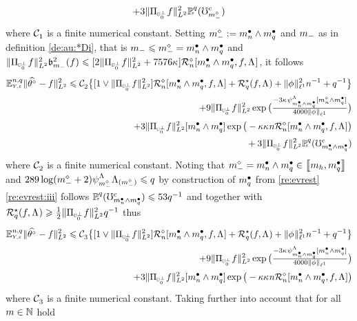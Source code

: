 \begin{pro}
\begin{multline*}
+3
\VnormLp{\Proj[{\mHiH[0]^\perp}]\xdf}^2\FuVg[\ssE]{\rE}(\aixEv[\mdDi]^c)
  \end{multline*}
where $\cst{1}$ is a finite numerical constant. Setting
$\mdDi:=\sDi{\ssY}\wedge\sDi{\ssE}$  and $\mDi$ as in  definition
\eqref{de:au:*Di}, that is  $\mDi\leq\mdDi=\sDi{\ssY}\wedge\sDi{\ssE}$ and  $\VnormLp{\Proj[{\mHiH[0]^\perp}]\xdf}^2\bias[\mDi]^2(\xdf) \leq
  [2\VnormLp{\Proj[{\mHiH[0]^\perp}]\xdf}^2+7576\cpen]\hRaDi{\sDi{\ssY}\wedge\sDi{\ssE},\xdf,\iSv}$,
  it follows
\begin{multline*}
\FuEx[\ssY,\ssE]{\rY,\rE}\VnormLp{\hxdfPr[]-\xdf}^2\leq\cst{2}\big\{[1\vee\VnormLp{\Proj[{\mHiH[0]^\perp}]\xdf}^2]\hRaDi{\sDi{\ssY}\wedge\sDi{\ssE},\xdf,\iSv}+\mRa{\xdf,\iSv}+\Vnormlp[1]{\fydf}^2\ssY^{-1}+\ssE^{-1}\big\}
\\
\hfill+9
\VnormLp{\Proj[{\mHiH[0]^\perp}]\xdf}^2\exp\big(\tfrac{-3\cpen\cmiSv[\sDi{\ssY}\wedge\sDi{\ssE}][\aDi{\ssY}\wedge\sDi{\ssE}]}{4000\Vnormlp[1]{\fydf}}\big)
\\\hfill
+3
\VnormLp{\Proj[{\mHiH[0]^\perp}]\xdf}^2[\sDi{\ssY}\wedge\sDi{\ssE}]\exp\big(-\rWc\cpen\ssY\hRaDi{\sDi{\ssY}\wedge\sDi{\ssE},\xdf,\iSv}\big)\\\null\hfill
+3
\VnormLp{\Proj[{\mHiH[0]^\perp}]\xdf}^2\FuVg[\ssE]{\rE}(\aixEv[\sDi{\ssY}\wedge\sDi{\ssE}]^c)
  \end{multline*}
where $\cst{2}$ is a finite numerical constant. Noting that
$\mdDi=\sDi{\ssY}\wedge\sDi{\ssE}\in\nset{\Di_{\ydf},\sDi{\ssE}}$ and
$289\log(\mdDi+2)\cmiSv[\mdDi]\miSv[\mdDi]\leq\ssE$ by construction of
$\sDi{\ssE}$ from \cref{re:evrest} \ref{re:evrest:iii} follows
$\FuVg[\ssE]{\rE}(\aixEv[\sDi{\ssY}\wedge\sDi{\ssE}]^c)\leq53\ssE^{-1}$
and  together with $\mRa{\xdf,\iSv}\geq\tfrac{1}{2}\VnormLp{\Proj[{\mHiH[0]^\perp}]\xdf}^2\ssE^{-1}$
thus
\begin{multline*}
\FuEx[\ssY,\ssE]{\rY,\rE}\VnormLp{\hxdfPr[]-\xdf}^2\leq\cst{3}\big\{[1\vee\VnormLp{\Proj[{\mHiH[0]^\perp}]\xdf}^2]\hRaDi{\sDi{\ssY}\wedge\sDi{\ssE},\xdf,\iSv}+\mRa{\xdf,\iSv}+\Vnormlp[1]{\fydf}^2\ssY^{-1}+\ssE^{-1}\big\}
\\
\hfill+9
\VnormLp{\Proj[{\mHiH[0]^\perp}]\xdf}^2\exp\big(\tfrac{-3\cpen\cmiSv[\sDi{\ssY}\wedge\sDi{\ssE}][\sDi{\ssY}\wedge\sDi{\ssE}]}{4000\Vnormlp[1]{\fydf}}\big)
\\\hfill
+3
\VnormLp{\Proj[{\mHiH[0]^\perp}]\xdf}^2[\sDi{\ssY}\wedge\sDi{\ssE}]\exp\big(-\rWc\cpen\ssY\hRaDi{\sDi{\ssY}\wedge\sDi{\ssE},\xdf,\iSv}\big)
  \end{multline*}
where $\cst{3}$ is a finite numerical constant. Taking further into account that for all $\Di\in\Nz$ hold

\end{pro}
